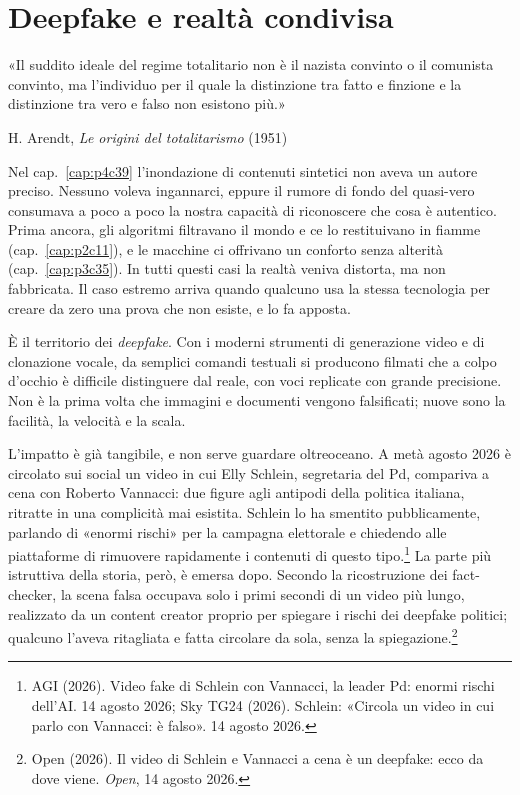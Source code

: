 \chapter{Deepfake e realtà condivisa}
\label{cap:p3c38}

\epigraph{«Il suddito ideale del regime totalitario non è il nazista convinto o il comunista convinto, ma l'individuo per il quale la distinzione tra fatto e finzione e la distinzione tra vero e falso non esistono più.»}{H. Arendt, \textit{Le origini del totalitarismo} (1951)}

Nel cap.~\ref{cap:p4c39} l'inondazione di contenuti sintetici non aveva un autore preciso. Nessuno voleva ingannarci, eppure il rumore di fondo del quasi-vero consumava a poco a poco la nostra capacità di riconoscere che cosa è autentico. Prima ancora, gli algoritmi filtravano il mondo e ce lo restituivano in fiamme (cap.~\ref{cap:p2c11}), e le macchine ci offrivano un conforto senza alterità (cap.~\ref{cap:p3c35}). In tutti questi casi la realtà veniva distorta, ma non fabbricata. Il caso estremo arriva quando qualcuno usa la stessa tecnologia per creare da zero una prova che non esiste, e lo fa apposta.

È il territorio dei \textit{deepfake}. Con i moderni strumenti di generazione video e di clonazione vocale, da semplici comandi testuali si producono filmati che a colpo d'occhio è difficile distinguere dal reale, con voci replicate con grande precisione. Non è la prima volta che immagini e documenti vengono falsificati; nuove sono la facilità, la velocità e la scala.

L'impatto è già tangibile, e non serve guardare oltreoceano. A metà agosto 2026 è circolato sui social un video in cui Elly Schlein, segretaria del Pd, compariva a cena con Roberto Vannacci: due figure agli antipodi della politica italiana, ritratte in una complicità mai esistita. Schlein lo ha smentito pubblicamente, parlando di «enormi rischi» per la campagna elettorale e chiedendo alle piattaforme di rimuovere rapidamente i contenuti di questo tipo.\footnote{AGI (2026). Video fake di Schlein con Vannacci, la leader Pd: enormi rischi dell'AI. 14 agosto 2026; Sky TG24 (2026). Schlein: «Circola un video in cui parlo con Vannacci: è falso». 14 agosto 2026.} La parte più istruttiva della storia, però, è emersa dopo. Secondo la ricostruzione dei fact-checker, la scena falsa occupava solo i primi secondi di un video più lungo, realizzato da un content creator proprio per spiegare i rischi dei deepfake politici; qualcuno l'aveva ritagliata e fatta circolare da sola, senza la spiegazione.\footnote{Open (2026). Il video di Schlein e Vannacci a cena è un deepfake: ecco da dove viene. \textit{Open}, 14 agosto 2026.}

